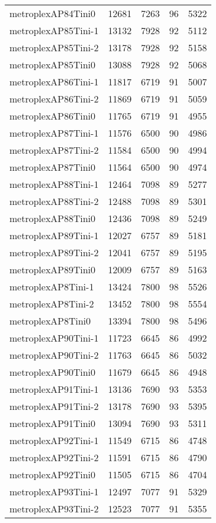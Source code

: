 \begin{longtable}{lrrrr}
metroplexAP84Tini0 & 12681 & 7263 & 96 & 5322 \\
metroplexAP85Tini-1 & 13132 & 7928 & 92 & 5112 \\
metroplexAP85Tini-2 & 13178 & 7928 & 92 & 5158 \\
metroplexAP85Tini0 & 13088 & 7928 & 92 & 5068 \\
metroplexAP86Tini-1 & 11817 & 6719 & 91 & 5007 \\
metroplexAP86Tini-2 & 11869 & 6719 & 91 & 5059 \\
metroplexAP86Tini0 & 11765 & 6719 & 91 & 4955 \\
metroplexAP87Tini-1 & 11576 & 6500 & 90 & 4986 \\
metroplexAP87Tini-2 & 11584 & 6500 & 90 & 4994 \\
metroplexAP87Tini0 & 11564 & 6500 & 90 & 4974 \\
metroplexAP88Tini-1 & 12464 & 7098 & 89 & 5277 \\
metroplexAP88Tini-2 & 12488 & 7098 & 89 & 5301 \\
metroplexAP88Tini0 & 12436 & 7098 & 89 & 5249 \\
metroplexAP89Tini-1 & 12027 & 6757 & 89 & 5181 \\
metroplexAP89Tini-2 & 12041 & 6757 & 89 & 5195 \\
metroplexAP89Tini0 & 12009 & 6757 & 89 & 5163 \\
metroplexAP8Tini-1 & 13424 & 7800 & 98 & 5526 \\
metroplexAP8Tini-2 & 13452 & 7800 & 98 & 5554 \\
metroplexAP8Tini0 & 13394 & 7800 & 98 & 5496 \\
metroplexAP90Tini-1 & 11723 & 6645 & 86 & 4992 \\
metroplexAP90Tini-2 & 11763 & 6645 & 86 & 5032 \\
metroplexAP90Tini0 & 11679 & 6645 & 86 & 4948 \\
metroplexAP91Tini-1 & 13136 & 7690 & 93 & 5353 \\
metroplexAP91Tini-2 & 13178 & 7690 & 93 & 5395 \\
metroplexAP91Tini0 & 13094 & 7690 & 93 & 5311 \\
metroplexAP92Tini-1 & 11549 & 6715 & 86 & 4748 \\
metroplexAP92Tini-2 & 11591 & 6715 & 86 & 4790 \\
metroplexAP92Tini0 & 11505 & 6715 & 86 & 4704 \\
metroplexAP93Tini-1 & 12497 & 7077 & 91 & 5329 \\
metroplexAP93Tini-2 & 12523 & 7077 & 91 & 5355 \\

\end{longtable}
